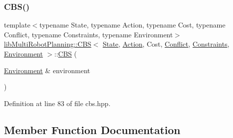 \subsubsection{\texorpdfstring{C\+B\+S()}{CBS()}}
{\footnotesize\ttfamily template$<$typename State, typename Action, typename Cost, typename Conflict, typename Constraints, typename Environment$>$ \\
\hyperlink{classlib_multi_robot_planning_1_1_c_b_s}{lib\+Multi\+Robot\+Planning\+::\+C\+BS}$<$ \hyperlink{structlib_multi_robot_planning_1_1_state}{State}, \hyperlink{namespacelib_multi_robot_planning_aba73fb71693f86a324adfa0e41e1053d}{Action}, Cost, \hyperlink{structlib_multi_robot_planning_1_1_conflict}{Conflict}, \hyperlink{structlib_multi_robot_planning_1_1_constraints}{Constraints}, \hyperlink{classlib_multi_robot_planning_1_1_environment}{Environment} $>$\+::\hyperlink{classlib_multi_robot_planning_1_1_c_b_s}{C\+BS} (\begin{DoxyParamCaption}\item[{\hyperlink{classlib_multi_robot_planning_1_1_environment}{Environment} \&}]{environment }\end{DoxyParamCaption})\hspace{0.3cm}{\ttfamily [inline]}}



Definition at line 83 of file cbs.\+hpp.



\subsection{Member Function Documentation}
\mbox{\label{classlib_multi_robot_planning_1_1_c_b_s_a09eec524489ee5cfbf66c95a951d7bbe}} 
